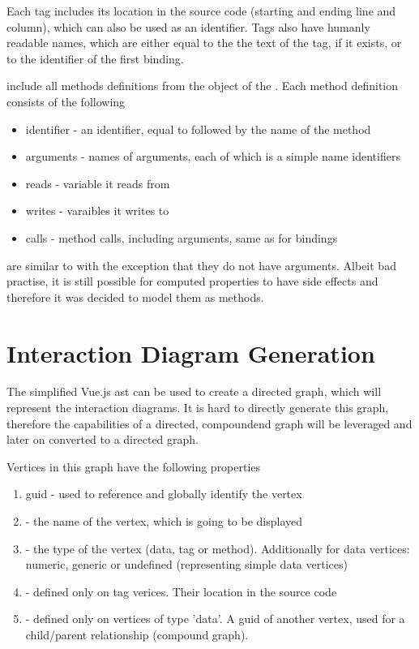 Each tag includes its location in the source code (starting and ending line and column), which can also be used as an identifier. Tags also have humanly readable names, which are either equal to the the text of the tag, if it exists, or to the identifier of the first binding. 

 include all methods definitions from the  object of the . Each method definition consists of the following
\begin{itemize}
    \item identifier - an identifier, equal to  followed by the name of the method
    \item arguments - names of arguments, each of which is a simple name identifiers
    \item reads - variable it reads from
    \item writes - varaibles it writes to
    \item calls - method calls, including arguments, same as for bindings 
\end{itemize}

 are similar to  with the exception that they do not have arguments. Albeit bad practise, it is still possible for computed properties to have side effects and therefore it was decided to model them as methods.

\section{Interaction Diagram Generation}

The simplified Vue.js \gls{ast} can be used to create a directed graph, which will represent the interaction diagrams. It is hard to directly generate this graph, therefore the capabilities of a directed, compoundend graph will be leveraged and later on converted to a directed graph. 

Vertices in this graph have the following properties
\begin{enumerate}
    \item \gls{guid} - used to reference and globally identify the vertex 
    \item {} - the name of the vertex, which is going to be displayed
    \item {} - the type of the vertex (data, tag or method). Additionally for data vertices: numeric, generic or undefined (representing simple data vertices)
    \item {} - defined only on tag verices. Their location in the source code
    \item {} - defined only on vertices of type 'data'. A \gls{guid} of another vertex, used for a child/parent relationship (compound graph).
\end{enumerate}

